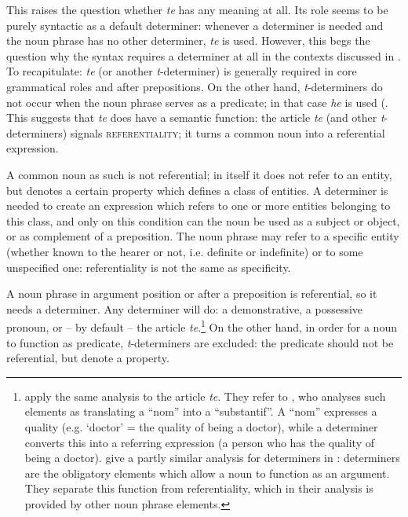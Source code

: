 This raises the question whether \textit{te} has any meaning at all. Its role seems to be purely syntactic as a default determiner: whenever a determiner is needed and the noun phrase has no other determiner, \textit{te} is used. However, this begs the question why the syntax requires a determiner at all in the contexts discussed in . To recapitulate: \textit{te} (or another \textit{t}-determiner) is generally required in core grammatical roles and after prepositions. On the other hand, \textit{t}-determiners do not occur when the noun phrase serves as a predicate; in that case \textit{he} is used (. This suggests that \textit{te} does have a semantic function: the article \textit{te} (and other \textit{t}-determiners) signals \textsc{referentiality}; it turns a common noun into a referential expression. 

A common noun as such is not referential; in itself it does not refer to an entity, but denotes a certain property which defines a class of entities. A determiner is needed to create an expression which refers to one or more entities belonging to this class, and only on this condition can the noun be used as a subject or object, or as complement of a preposition. The noun phrase may refer to a specific entity (whether known to the hearer or not, i.e. definite or indefinite) or to some unspecified one: referentiality is not the same as specificity. 

A noun phrase in argument position or after a preposition is referential, so it needs a determiner. Any determiner will do: a demonstrative, a possessive pronoun, or – by default – the article \textit{te}.\footnote{\label{fn:253}\citet[467]{RigoVernaudon2004} apply the same analysis to the  article \textit{te}. They refer to \citet{Lemaréchal1989}, who analyses such elements as translating a “nom” into a “substantif”. A “nom” expresses a quality (e.g. ‘doctor’ = the quality of being a doctor), while a determiner converts this into a referring expression (a person who has the quality of being a doctor). \citet{GorrieKellner2010} give a partly similar analysis for determiners in : determiners are the obligatory elements which allow a noun to function as an argument. They separate this function from referentiality, which in their analysis is provided by other noun phrase elements.} On the other hand, in order for a noun to function as predicate, \textit{t}{}-determiners are excluded: the predicate should not be referential, but denote a property.

